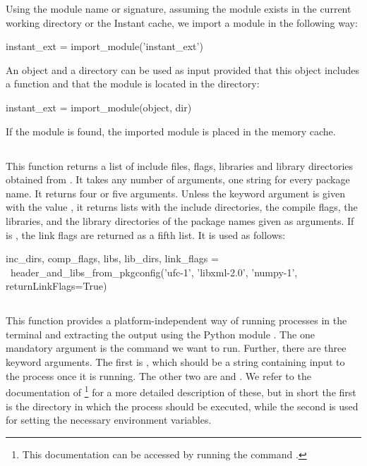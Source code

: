 Using the module name or signature, assuming the
module  exists in the current working directory or
the Instant cache, we import a module in the following way:
\begin{python}
instant_ext = import_module('instant_ext')
\end{python}
An object and a directory can be used as input provided that this object includes a
function  and that the module is located in the
directory:
\begin{python}
instant_ext = import_module(object, dir)
\end{python}
If the module is found, the imported module is placed in the memory cache.

\subsection[header\_and\_libs\_from\_pkgconfig]{}

This function returns a list of include files, flags, libraries and library
directories obtained from
. It takes any
number of arguments, one string for every package name.  It returns
four or five arguments. Unless the keyword
argument  is given with the value , it
returns lists with the include directories, the compile flags, the
libraries, and the library directories of the package names given as
arguments. If  is , the link flags are
returned as a fifth list.  It is used as follows:
\begin{python}
inc_dirs, comp_flags, libs, lib_dirs, link_flags = \
header_and_libs_from_pkgconfig('ufc-1', 'libxml-2.0',
                               'numpy-1',
                               returnLinkFlags=True)
\end{python}

\subsection[get\_status\_output]{}

This function provides a platform-independent way of running processes
in the terminal and extracting the output using the Python
module . The one mandatory argument is the command we
want to run. Further, there are three keyword arguments. The first
is \emp{input}, which should be a string containing input to the
process once it is running. The other two are \emp{cwd}
and . We refer to the documentation
of \footnote{This documentation can be accessed by
running the command \emp{pydoc subprocess}.} for a more detailed
description of these, but in short the first is the directory in which
the process should be executed, while the second is used for setting
the necessary environment variables.

